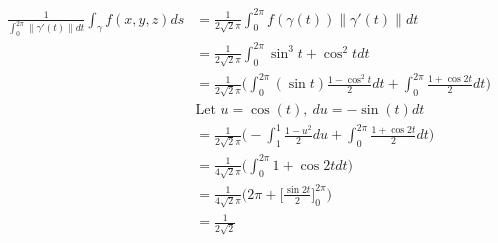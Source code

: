 \documentclass{article}
\newcommand{\norm}[1]{\| #1 \|}
\begin{document}
\begin{enumerate}
\begin{enumerate}
\begin{align*}
        \frac{1}{\int_0^{2\pi} \norm{\gamma'(t)}dt}  \int_{\gamma}f(x,y,z)ds &= \frac{1}{2\sqrt{2}\pi} \int_0^{2\pi} f(\gamma(t)) \norm{\gamma'(t)}dt \\
        &= \frac{1}{2\sqrt{2}\pi} \int_0^{2\pi} \sin^3t + \cos^2t dt  \\
        &= \frac{1}{2\sqrt{2}\pi} \Big( \int_0^{2\pi} (\sin t)\frac{1 - \cos^2t}{2} dt + \int_0^{2\pi} \frac{1+\cos 2t}{2} dt  \Big) \\
        &\text{Let } u = \cos(t),\: du = -\sin(t)dt \\
        &= \frac{1}{2\sqrt{2}\pi} \Big( -\int_1^{1} \frac{1 - u^2}{2} du + \int_0^{2\pi} \frac{1+\cos 2t}{2} dt  \Big) \\
        &= \frac{1}{4\sqrt{2}\pi} \Big( \int_0^{2\pi} 1+\cos 2t dt  \Big) \\
        &= \frac{1}{4\sqrt{2}\pi} \Big( 2 \pi + \Big[\frac{\sin 2t}{2} \Big]_0^{2\pi} \Big) \\
        &= \frac{1}{2\sqrt{2}} \\
    \end{align*}
\end{enumerate}
\end{enumerate}
\end{document}
